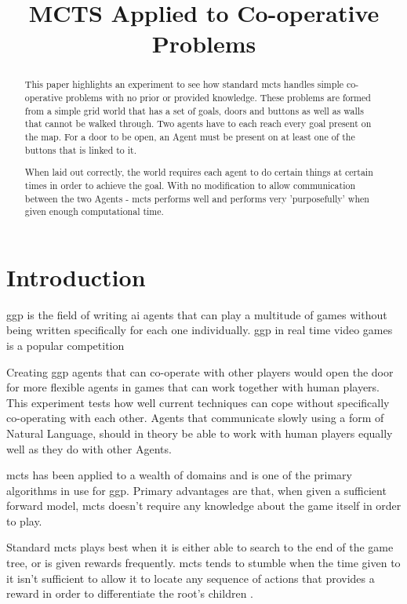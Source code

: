\documentclass{IEEEtran}
\title{MCTS Applied to Co-operative Problems}
\begin{document}
\maketitle
\begin{abstract}
This paper highlights an experiment to see how standard \gls{mcts} handles simple co-operative problems with no prior or provided knowledge. These problems are formed from a simple grid world that has a set of goals, doors and buttons as well as walls that cannot be walked through. Two agents have to each reach every goal present on the map. For a door to be open, an Agent must be present on at least one of the buttons that is linked to it.

When laid out correctly, the world requires each agent to do certain things at certain times in order to achieve the goal. With no modification to allow communication between the two Agents - \gls{mcts} performs well and performs very 'purposefully' when given enough computational time.
\end{abstract}

\section{Introduction}
\gls{ggp} is the field of writing \gls{ai} agents that can play a multitude of games without being written specifically for each one individually. \gls{ggp} in real time video games is a popular competition \cite{perez2014}

Creating \gls{ggp} agents that can co-operate with other players would open the door for more flexible agents in games that can work together with human players. This experiment tests how well current techniques can cope without specifically co-operating with each other. Agents that communicate slowly using a form of Natural Language, should in theory be able to work with human players equally well as they do with other Agents.

\gls{mcts} \cite{browne2012survey} has been applied to a wealth of domains and is one of the primary algorithms in use for \gls{ggp}\cite{finnsson2008simulation}. Primary advantages are that, when given a sufficient forward model, \gls{mcts} doesn't require any knowledge about the game itself in order to play.

Standard \gls{mcts} plays best when it is either able to search to the end of the game tree, or is given rewards frequently. \gls{mcts} tends to stumble when the time given to it isn't sufficient to allow it to locate any sequence of actions that provides a reward in order to differentiate the root's children \cite{perez2012monte}.
\end{document}
